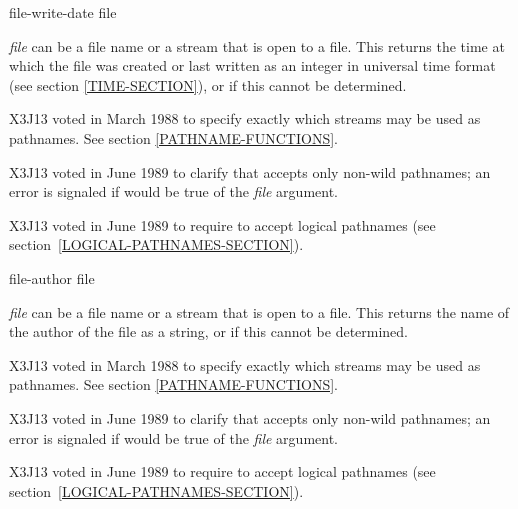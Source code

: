 \begin{defun}[Function]
file-write-date file

{\it file} can be a file name or a stream that is open to a file.
This returns the time at which the file was created
or last written as an integer in
universal time format (see section \ref{TIME-SECTION}),
or {\false} if this cannot be determined.

\begin{new}
X3J13 voted in March 1988
to specify exactly which streams may be used as pathnames.
See section \ref{PATHNAME-FUNCTIONS}.
\end{new}

\begin{newer}
X3J13 voted in June 1989 
to clarify that  accepts only non-wild pathnames;
an error is signaled if  would be true of
the {\it file} argument.
\end{newer}

\begin{newer}
X3J13 voted in June 1989  to require 
to accept logical pathnames (see section~\ref{LOGICAL-PATHNAMES-SECTION}).
\end{newer}
\end{defun}

\begin{defun}[Function]
file-author file

{\it file} can be a file name or a stream that is open to a file.
This returns the name of the author of the file as a string,
or {\false} if this cannot be determined.

\begin{new}
X3J13 voted in March 1988
to specify exactly which streams may be used as pathnames.
See section \ref{PATHNAME-FUNCTIONS}.
\end{new}

\begin{newer}
X3J13 voted in June 1989 
to clarify that  accepts only non-wild pathnames;
an error is signaled if  would be true of
the {\it file} argument.
\end{newer}

\begin{newer}
X3J13 voted in June 1989  to require 
to accept logical pathnames (see section~\ref{LOGICAL-PATHNAMES-SECTION}).
\end{newer}
\end{defun}

